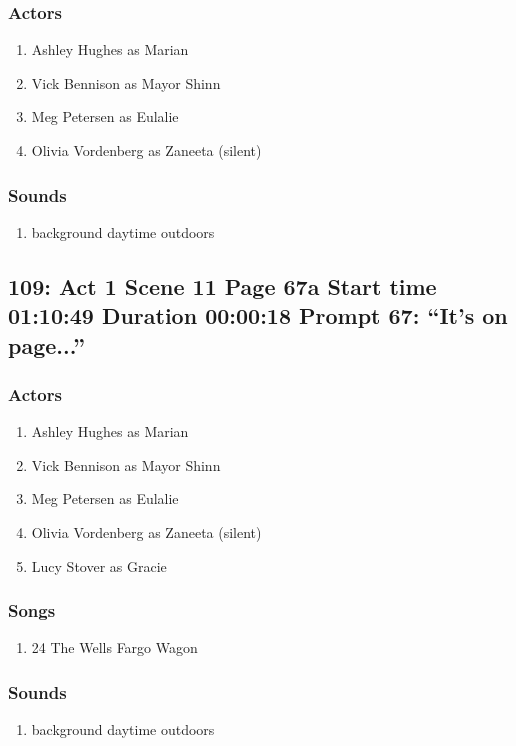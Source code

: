\subsubsection{Actors}
\begin{enumerate}
\item Ashley Hughes as Marian
\item Vick Bennison as Mayor Shinn
\item Meg Petersen as Eulalie
\item Olivia Vordenberg as Zaneeta (silent)
\end{enumerate}

\subsubsection{Sounds}
\begin{enumerate}
\item background daytime outdoors
\end{enumerate}
\subsection{109: Act 1 Scene 11 Page 67a Start time 01:10:49 Duration 00:00:18 Prompt 67: ``It's on page...''}

\subsubsection{Actors}
\begin{enumerate}
\item Ashley Hughes as Marian
\item Vick Bennison as Mayor Shinn
\item Meg Petersen as Eulalie
\item Olivia Vordenberg as Zaneeta (silent)
\item Lucy Stover as Gracie
\end{enumerate}

\subsubsection{Songs}
\begin{enumerate}
\item 24 The Wells Fargo Wagon
\end{enumerate}\subsubsection{Sounds}
\begin{enumerate}
\item background daytime outdoors
\end{enumerate}
